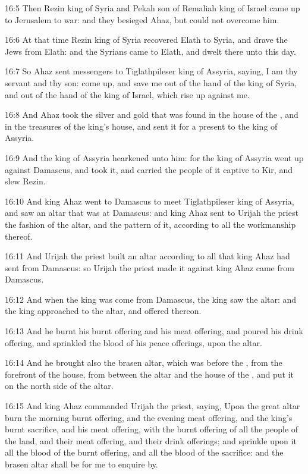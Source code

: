 16:5 Then Rezin king of Syria and Pekah son of Remaliah king of Israel came up to Jerusalem to war: and they besieged Ahaz, but could not overcome him.

16:6 At that time Rezin king of Syria recovered Elath to Syria, and drave the Jews from Elath: and the Syrians came to Elath, and dwelt there unto this day.

16:7 So Ahaz sent messengers to Tiglathpileser king of Assyria, saying, I am thy servant and thy son: come up, and save me out of the hand of the king of Syria, and out of the hand of the king of Israel, which rise up against me.

16:8 And Ahaz took the silver and gold that was found in the house of the \LORD, and in the treasures of the king's house, and sent it for a present to the king of Assyria.

16:9 And the king of Assyria hearkened unto him: for the king of Assyria went up against Damascus, and took it, and carried the people of it captive to Kir, and slew Rezin.

16:10 And king Ahaz went to Damascus to meet Tiglathpileser king of Assyria, and saw an altar that was at Damascus: and king Ahaz sent to Urijah the priest the fashion of the altar, and the pattern of it, according to all the workmanship thereof.

16:11 And Urijah the priest built an altar according to all that king Ahaz had sent from Damascus: so Urijah the priest made it against king Ahaz came from Damascus.

16:12 And when the king was come from Damascus, the king saw the altar: and the king approached to the altar, and offered thereon.

16:13 And he burnt his burnt offering and his meat offering, and poured his drink offering, and sprinkled the blood of his peace offerings, upon the altar.

16:14 And he brought also the brasen altar, which was before the \LORD, from the forefront of the house, from between the altar and the house of the \LORD, and put it on the north side of the altar.

16:15 And king Ahaz commanded Urijah the priest, saying, Upon the great altar burn the morning burnt offering, and the evening meat offering, and the king's burnt sacrifice, and his meat offering, with the burnt offering of all the people of the land, and their meat offering, and their drink offerings; and sprinkle upon it all the blood of the burnt offering, and all the blood of the sacrifice: and the brasen altar shall be for me to enquire by.

